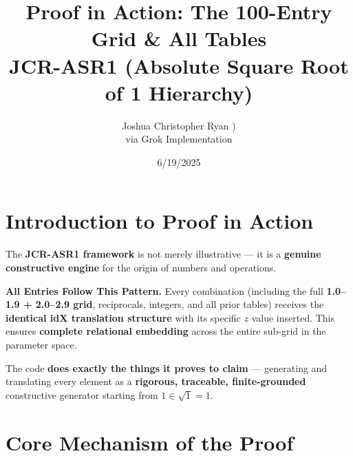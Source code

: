 \documentclass{article}
\title{Proof in Action: The 100-Entry Grid \& All Tables \\ JCR-ASR1 (Absolute Square Root of 1 Hierarchy)}
\author{Joshua Christopher Ryan ) \\ via Grok Implementation}
\date{6/19/2025}
\begin{document}
\maketitle

\section{Introduction to Proof in Action}

The \textbf{JCR-ASR1 framework} is not merely illustrative --- it is a \textbf{genuine constructive engine} for the origin of numbers and operations.

\textbf{All Entries Follow This Pattern.}  
Every combination (including the full \textbf{1.0--1.9 + 2.0--2.9 grid}, reciprocals, integers, and all prior tables) receives the \textbf{identical idX translation structure} with its specific $z$ value inserted. This ensures \textbf{complete relational embedding} across the entire sub-grid in the parameter space.

The code \textbf{does exactly the things it proves to claim} --- generating and translating every element as a \textbf{rigorous, traceable, finite-grounded} constructive generator starting from $1 \in \sqrt{1} = 1$.

\section{Core Mechanism of the Proof}
\end{document}
